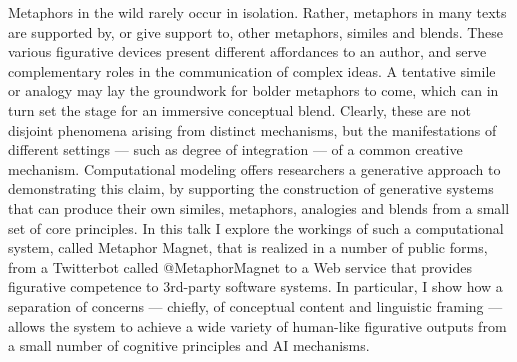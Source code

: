\documentclass[10pt,letterpaper]{article}
\begin{document}
Metaphors in the wild rarely occur in isolation. Rather, metaphors in many texts are supported by, or give support to, other metaphors, similes and blends.  These various figurative devices present different affordances to an author, and serve complementary roles in the communication of complex ideas. A tentative simile or analogy may lay the groundwork for bolder metaphors to come, which can in turn set the stage for an immersive conceptual blend. Clearly, these are not disjoint phenomena arising from distinct mechanisms, but the manifestations of different settings --- such as degree of integration --- of a common creative mechanism. Computational modeling offers researchers a generative approach to demonstrating this claim, by supporting the construction of generative systems that can produce their own similes, metaphors, analogies and blends from a small set of core principles. In this talk I explore the workings of such a computational system, called Metaphor Magnet, that is realized in a number of public forms, from a Twitterbot called @MetaphorMagnet to a Web service that provides figurative competence to 3rd-party software systems. In particular, I show how a separation of concerns --- chiefly, of conceptual content and linguistic framing --- allows the system to achieve a wide variety of human-like figurative outputs from a small number of cognitive principles and AI mechanisms.




\setlength{\bibleftmargin}{.125in}
\setlength{\bibindent}{-\bibleftmargin}


\end{document}
